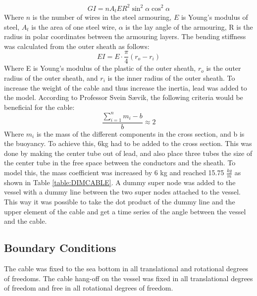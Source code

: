 \begin{equation}
    GI=nA_t E R^2 \sin^2 \alpha \cos^2 \alpha
\end{equation}
Where $n$ is the number of wires in the steel armouring, $E$ is Young's modulus of steel, $A_t$ is the area of one steel wire, $\alpha$ is the lay angle of the armouring, R is the radius in polar coordinates between the armouring layers.  \newline
\newline 
The bending stiffness was calculated from the outer sheath as follows:
\begin{equation}
    EI= E\cdot \frac{\pi}{4}(r_o-r_i)
\end{equation}
Where E is Young's modulus of the plastic of the outer sheath, $r_o$ is the outer radius of the outer sheath, and $r_i$ is the inner radius of the outer sheath. \newline
\newline 
To increase the weight of the cable and thus increase the inertia, lead was added to the model. According to Professor Svein Sævik, the following criteria would be beneficial for the cable:
\begin{equation}
    \frac{\sum_{i=1}^n m_i - b}{b}\approx 2
\end{equation}
Where $m_i$ is the mass of the different components in the cross section, and b is the buoyancy. To achieve this, 6kg had to be added to the cross section. This was done by making the center tube out of lead, and also place three tubes the size of the center tube in the free space between the conductors and the sheath. To model this, the mass coefficient was increased by 6 kg and reached 15.75 $\frac{kg}{m}$ as shown in Table \ref{table:DIMCABLE}. \newline
\newline A dummy super node was added to the vessel with a dummy line between the two super nodes attached to the vessel. This way it was possible to take the dot product of the dummy line and the upper element of the cable and get a time series of the angle between the vessel and the cable.

\subsection{Boundary Conditions}
The cable was fixed to the sea bottom in all translational and rotational degrees of freedoms. The cable hang-off on the vessel was fixed in all translational degrees of freedom and free in all rotational degrees of freedom. 

